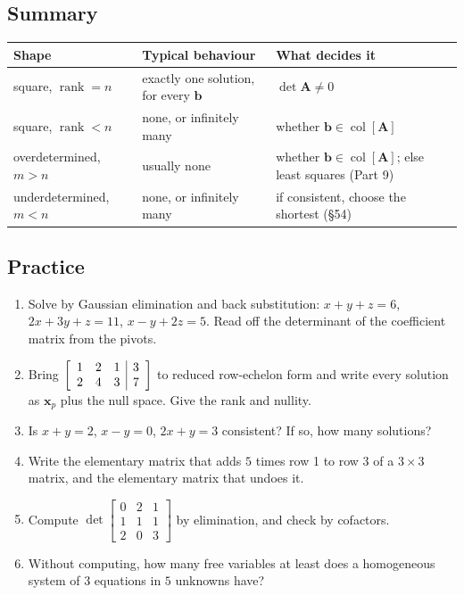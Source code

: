 \documentclass[11pt]{article}
\theoremstyle{plain}
\theoremstyle{definition}
\theoremstyle{remark}
\newcommand{\vc}[1]{\mathbf{#1}}
\newcommand{\mt}[1]{\mathbf{#1}}
\newcommand{\colsp}[1]{\operatorname{col}[#1]}
\DeclareMathOperator{\rank}{rank}
\newenvironment{aug}[1]{\left[\begin{array}{#1}}{\end{array}\right]}
\begin{document}
\subsection{Summary}
\begin{center}
\renewcommand{\arraystretch}{1.35}
\begin{tabular}{@{}p{3.6cm} p{4.6cm} p{6.4cm}@{}}
\toprule
\textbf{Shape} & \textbf{Typical behaviour} & \textbf{What decides it} \\
\midrule
square, $\rank=n$ & exactly one solution, for every $\vc{b}$ & $\det\mt{A}\neq0$ \\
square, $\rank<n$ & none, or infinitely many & whether $\vc{b}\in\colsp{\mt{A}}$ \\
overdetermined, $m>n$ & usually none & whether $\vc{b}\in\colsp{\mt{A}}$; else least squares (Part 9) \\
underdetermined, $m<n$ & none, or infinitely many & if consistent, choose the shortest (\S54) \\
\bottomrule
\end{tabular}
\end{center}

\subsection{Practice}
\begin{enumerate}[label=\textbf{P\arabic*.},leftmargin=2.6em,itemsep=5pt]
  \item Solve by Gaussian elimination and back substitution:
        $x+y+z=6$, $2x+3y+z=11$, $x-y+2z=5$. Read off the determinant of the
        coefficient matrix from the pivots.
  \item Bring $\begin{aug}{ccc|c}1&2&1&3\\2&4&3&7\end{aug}$ to reduced row-echelon
        form and write every solution as $\vc{x}_p$ plus the null space. Give the
        rank and nullity.
  \item Is $x+y=2$, $x-y=0$, $2x+y=3$ consistent? If so, how many solutions?
  \item Write the elementary matrix that adds $5$ times row 1 to row 3 of a
        $3\times3$ matrix, and the elementary matrix that undoes it.
  \item Compute $\det\begin{bmatrix}0&2&1\\1&1&1\\2&0&3\end{bmatrix}$ by
        elimination, and check by cofactors.
  \item Without computing, how many free variables at least does a homogeneous
        system of $3$ equations in $5$ unknowns have?
\end{enumerate}
\end{document}
